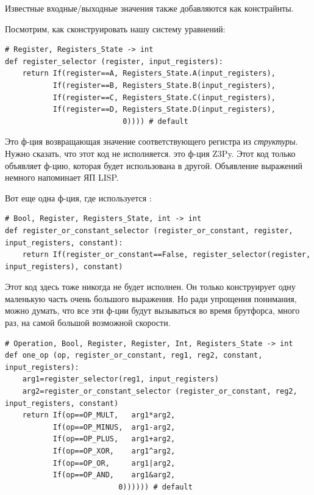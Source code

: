 Известные входные/выходные значения также добавляются как констрайнты.

Посмотрим, как сконструировать нашу систему уравнений:

\begin{lstlisting}
# Register, Registers_State -> int
def register_selector (register, input_registers):
    return If(register==A, Registers_State.A(input_registers),
           If(register==B, Registers_State.B(input_registers), 
           If(register==C, Registers_State.C(input_registers), 
           If(register==D, Registers_State.D(input_registers), 
                           0)))) # default
\end{lstlisting}

Это ф-ция возвращающая значение соответствующего регистра из \textit{структуры}.
Нужно сказать, что этот код не исполняется.
 это ф-ция Z3Py. 
Этот код только объявляет ф-цию, которая будет использована в другой.
Объявление выражений немного напоминает ЯП LISP.

Вот еще одна ф-ция, где используется :

\begin{lstlisting}
# Bool, Register, Registers_State, int -> int
def register_or_constant_selector (register_or_constant, register, input_registers, constant): 
    return If(register_or_constant==False, register_selector(register, input_registers), constant)
\end{lstlisting}

Этот код здесь тоже никогда не будет исполнен.
Он только конструирует одну маленькую часть очень большого выражения.
Но ради упрощения понимания, можно думать, что все эти ф-ции будут вызываться во время брутфорса, много раз,
на самой большой возможной скорости.

\begin{lstlisting}
# Operation, Bool, Register, Register, Int, Registers_State -> int
def one_op (op, register_or_constant, reg1, reg2, constant, input_registers):
    arg1=register_selector(reg1, input_registers)
    arg2=register_or_constant_selector (register_or_constant, reg2, input_registers, constant)
    return If(op==OP_MULT,   arg1*arg2,
           If(op==OP_MINUS,  arg1-arg2,
           If(op==OP_PLUS,   arg1+arg2, 
           If(op==OP_XOR,    arg1^arg2, 
           If(op==OP_OR,     arg1|arg2, 
           If(op==OP_AND,    arg1&arg2, 
                          0)))))) # default
\end{lstlisting}

